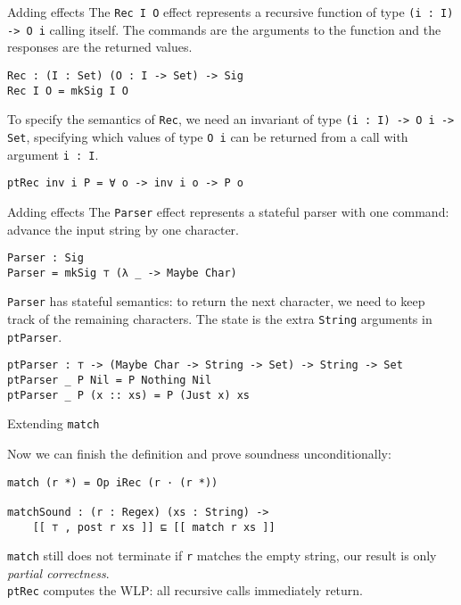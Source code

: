 \documentclass{beamer}
\newcommand{\Agda}[1]{\texttt{\footnotesize #1}\xspace}
\newcommand{\match}{\Agda{match}}
\begin{document}
\begin{frame}[fragile]{Adding effects}
The \Agda{Rec I O} effect represents a recursive function of type \Agda{(i : I) -> O i} calling itself.
The commands are the arguments to the function and the responses are the returned values.
\begin{verbatim}
Rec : (I : Set) (O : I -> Set) -> Sig
Rec I O = mkSig I O
\end{verbatim}
To specify the semantics of \Agda{Rec}, we need an invariant of type \Agda{(i : I) -> O i -> Set},
specifying which values of type \Agda{O i} can be returned from a call with argument \Agda{i : I}.
\begin{verbatim}
ptRec inv i P = ∀ o -> inv i o -> P o
\end{verbatim}
\end{frame}

\begin{frame}[fragile]{Adding effects}
The \Agda{Parser} effect represents a stateful parser with one command:
advance the input string by one character.

\begin{verbatim}
Parser : Sig
Parser = mkSig ⊤ (λ _ -> Maybe Char)
\end{verbatim}

\Agda{Parser} has stateful semantics: to return the next character, we need to keep track of the remaining characters.
The state is the extra \Agda{String} arguments in \Agda{ptParser}.
\begin{verbatim}
ptParser : ⊤ -> (Maybe Char -> String -> Set) -> String -> Set
ptParser _ P Nil = P Nothing Nil
ptParser _ P (x :: xs) = P (Just x) xs
\end{verbatim}

\end{frame}

\begin{frame}[fragile]{Extending \match}

Now we can finish the definition and prove soundness unconditionally:
\begin{verbatim}
match (r *) = Op iRec (r · (r *))

matchSound : (r : Regex) (xs : String) ->
    [[ ⊤ , post r xs ]] ⊑ [[ match r xs ]]
\end{verbatim}

\pause
\match still does not terminate if \Agda{r} matches the empty string, our result is only \emph{partial correctness}.\\
\Agda{ptRec} computes the WLP: all recursive calls immediately return.
\end{frame}
\end{document}
